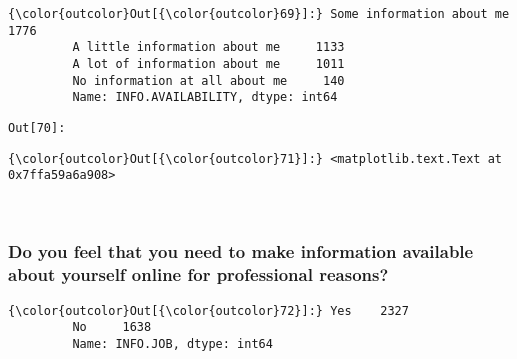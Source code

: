 \documentclass[11pt]{article}
\begin{document}
            \begin{Verbatim}[commandchars=\\\{\}]
{\color{outcolor}Out[{\color{outcolor}69}]:} Some information about me         1776
         A little information about me     1133
         A lot of information about me     1011
         No information at all about me     140
         Name: INFO.AVAILABILITY, dtype: int64
\end{Verbatim}
        
\texttt{\color{outcolor}Out[{\color{outcolor}70}]:}
    

    


            \begin{Verbatim}[commandchars=\\\{\}]
{\color{outcolor}Out[{\color{outcolor}71}]:} <matplotlib.text.Text at 0x7ffa59a6a908>
\end{Verbatim}
        
    \begin{center}
    \end{center}
    { \hspace*{\fill} \\}
    
    \subsubsection{Do you feel that you need to make information available
about yourself online for professional
reasons?}\label{do-you-feel-that-you-need-to-make-information-available-about-yourself-online-for-professional-reasons}


            \begin{Verbatim}[commandchars=\\\{\}]
{\color{outcolor}Out[{\color{outcolor}72}]:} Yes    2327
         No     1638
         Name: INFO.JOB, dtype: int64
\end{Verbatim}
        
\end{document}
